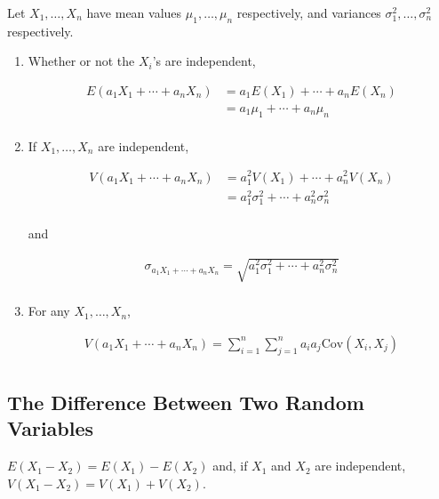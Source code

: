 \begin{proposition}
    Let $X_1,\dots,X_n$ have mean values $\mu_1,\dots,\mu_n$ respectively, and variances $\sigma_1^2,\dots,\sigma_n^2$ respectively. 

    \begin{enumerate}
        \item Whether or not the $X_i$'s are independent, 
        
        \begin{align*}
            E(a_1X_1+\cdots+a_nX_n) & = a_1E(X_1) + \cdots + a_nE(X_n) \\
            & = a_1\mu_1 + \cdots + a_n\mu_n \\
        \end{align*}
        \item If $X_1,\dots,X_n$ are independent, 
        
        \begin{align*}
            V(a_1X_1 + \cdots + a_nX_n) & = a_1^2V(X_1) + \cdots + a_n^2V(X_n) \\
            & = a_1^2\sigma_1^2 + \cdots + a_n^2\sigma_n^2 \\
        \end{align*}

        and  

        \begin{align*}
            \sigma_{a_1X_1+\cdots+a_nX_n} = \sqrt{a_1^2\sigma_1^2 + \cdots + a_n^2\sigma_n^2} \\
        \end{align*}
        \item For any $X_1,\dots,X_n$, 
        
        \begin{align*}
            V(a_1X_1+\cdots+a_nX_n) = \sum_{i=1}^n\sum_{j=1}^na_ia_j\text{Cov}(X_i,X_j) \\
        \end{align*}
    \end{enumerate}
\end{proposition}

\subsection{The Difference Between Two Random Variables}

\begin{proposition}
    $E(X_1-X_2) = E(X_1) - E(X_2)$ and, if $X_1$ and $X_2$ are independent, $V(X_1-X_2) = V(X_1) + V(X_2)$.
\end{proposition}

